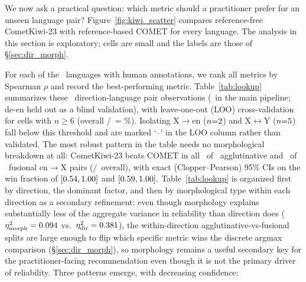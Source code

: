 \documentclass[11pt]{article}
\begin{document}
We now ask a practical question: which metric should a practitioner prefer for an unseen language pair? Figure~\ref{fig:kiwi_scatter} compares reference-free CometKiwi-23 with reference-based COMET for every language. The analysis in this section is exploratory; cells are small and the labels are those of \S\ref{sec:dir_morph}.

For each of the \NumHumanAnnotatedLanguages\ languages with human annotations, we rank all metrics by Spearman $\rho$ and record the best-performing metric.
Table~\ref{tab:lookup} summarizes these \TableFourTotalPairs\ direction-language pair observations (\TableFourMainPipelinePairs\ in the main pipeline; de-en held out as a blind validation), with leave-one-out (LOO) cross-validation for cells with $n \geq 6$ (overall \LOOOverallCorrect/\LOOOverallTotal\ = \LOOOverallPct\%). Isolating X$\to$en ($n{=}2$) and X$\leftrightarrow$Y ($n{=}5$) fall below this threshold and are marked `--' in the LOO column rather than validated.
The most robust pattern in the table needs no morphological breakdown at all: CometKiwi-23 beats COMET in all \BeatsCometEntoXAgglutin\ of \WinTotalEntoXAgglutin\ agglutinative and \BeatsCometEntoXFusional\ of \WinTotalEntoXFusional\ fusional en$\to$X pairs (\BeatsCometEntoXTotal/\EntoXTotalPairs\ overall), with exact (Clopper--Pearson) 95\% CIs on the win fraction of $[0.54, 1.00]$ and $[0.59, 1.00]$. Table~\ref{tab:lookup} is organized first by direction, the dominant factor, and then by morphological type within each direction as a secondary refinement: even though morphology explains substantially less of the aggregate variance in reliability than direction does ($\eta^2_{\text{morph}}=0.094$ vs.\ $\eta^2_{\text{dir}}=0.381$), the within-direction agglutinative-vs-fusional splits are large enough to flip which specific metric wins the discrete argmax comparison (\S\ref{sec:dir_morph}), so morphology remains a useful secondary key for the practitioner-facing recommendation even though it is not the primary driver of reliability.
Three patterns emerge, with decreasing confidence:
\end{document}
